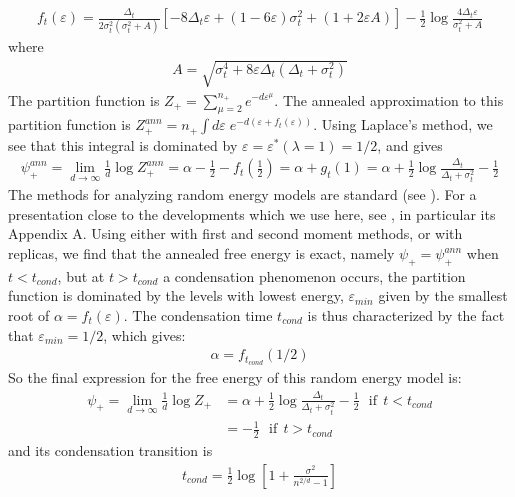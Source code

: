 \documentclass[10pt,twocolumn]{article}
\newcommand{\ve}{{\varepsilon}}
\begin{document}
\begin{align}
 f_t(\ve)=
\frac{\Delta_t}{2\sigma_t^2 (\sigma_t^2+A)}\left[
-8\Delta_t\ve +(1-6 \ve)\sigma_t^2+(1+2 \ve A)
\right]
-\frac{1}{2}\log\frac{4\Delta_t\ve}{\sigma_t^2+A}
\label{fdef}
\end{align}
where
\begin{align}
    A=\sqrt{\sigma_t^4+8\ve \Delta_t (\Delta_t+\sigma_t^2)}
\end{align}
The partition function is 
$Z_+= \sum_{\mu=2}^{n_+} e^{-d \ve^\mu}$.
The annealed approximation to this partition function is 
$Z_+^{ann}=n_+\int d \ve \; e^{-d (\ve+f_t(\ve)) }$. Using Laplace's method, we see that this integral is dominated by $\ve=\ve^*(\lambda=1)=1/2$, and gives 
\begin{align}
\psi_+^{ann}=\lim_{d\to\infty} \frac{1}{d}  \log Z_+^{ann} =
\alpha-\frac{1}{2}-f_t\left(\frac{1}{2}\right)
=\alpha+g_t(1)= \alpha+\frac{1}{2}\log\frac{\Delta_t}{\Delta_t+\sigma_t^2}-\frac{1}{2}
\end{align}
The methods for analyzing random energy models are standard (see \cite{derrida1981random, mezard2009information}). For a presentation close to the developments which we use here, see \cite{lucibello2023exponential},  in particular its Appendix A. Using either with first and second moment methods, or with replicas, we find that the annealed free energy is exact, namely $\psi_+=\psi_+^{ann}$ when $t<t_{cond}$, but at $t>t_{cond}$ a condensation phenomenon occurs, the partition function is dominated by the levels with lowest energy, $\ve_{min}$ given by the smallest root of 
$\alpha=\hat f_t(\ve)$. The condensation time $t_{cond}$ is  thus characterized by the fact that $\ve_{min}=1/2$, which gives:
\begin{align}
\alpha=f_{t_{cond}}(1/2)
\end{align}
So the final expression for the free energy of this random energy model is:
\begin{align}
\psi_+=\lim_{d\to\infty} \frac{1}{d}\log Z_+ &= 
\alpha+\frac{1}{2}\log\frac{\Delta_t}{\Delta_t+\sigma_t^2}-\frac{1}{2}
\ \ \  \text{if}\ \  t<t_{cond}
\nonumber \\
&= -\frac{1}{2} \ \ \  \text{if}\ \  t>t_{cond}
\label{phiplus}
\end{align}
and its condensation transition is
\begin{align}
t_{cond}=\frac{1}{2}\log\left[1+\frac{\sigma^2}{n^{2/d}-1}
\right]
\end{align}
\end{document}
